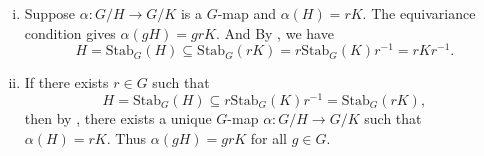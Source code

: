 \begin{prf}
    \begin{enumerate}[(i)]
        \item Suppose $\alpha: G / H \longrightarrow G / K$ is a $G$-map and $\alpha(H)=r K$. The equivariance condition gives $\alpha(g H)=g r K$. And By , we have 
        \[
            H=\mathrm{Stab}_G(H)\subseteq \mathrm{Stab}_G(rK)=r\mathrm{Stab}_G(K)r^{-1}=rKr^{-1}.
        \]
    \item If there exists $r \in G$ such that 
    \[ 
        H=\mathrm{Stab}_G(H)\subseteq r\mathrm{Stab}_G(K)r^{-1}=\mathrm{Stab}_G(rK),
    \]
    then by , there exists a unique $G$-map $\alpha:G/H\to G/K$ such that $\alpha(H)=rK$. Thus $\alpha(gH)=g rK$ for all $g\in G$.
    \end{enumerate}
\end{prf}

